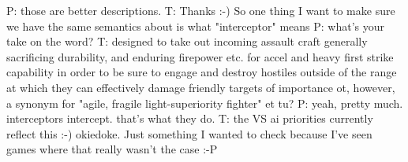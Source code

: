 P: those are better descriptions.
T: Thanks :-)
So one thing I want to make sure we have the same semantics about is what "interceptor" means
P: what's your take on the word?
T: designed to take out incoming assault craft
generally sacrificing durability, and enduring firepower etc. for accel and heavy first strike capability in order to be sure to engage and destroy hostiles outside of the range at which they can effectively damage friendly targets of importance
ot, however, a synonym for "agile, fragile light-superiority fighter"
et tu?
P: yeah, pretty much. interceptors intercept. that's what they do.
T: the VS ai priorities currently reflect this :-)
okiedoke. Just something I wanted to check because I've seen games where that really wasn't the case :-P

